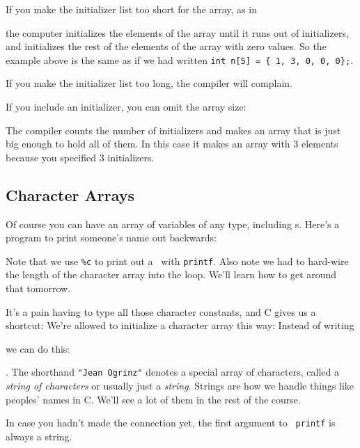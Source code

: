 If you make the initializer list too short for the array, as in

\begin{flushleft}
\verb% int n[5] = { 1, 3 }; %
\end{flushleft}

\noindent the computer initializes the elements of the array until it
runs out of initializers, and initializes the rest of the elements of
the array with zero values.  So the example above is the same as if we
had written {\tt int n[5] = \{ 1, 3, 0, 0, 0\};}.

If you make the initializer list too long, the compiler will complain.

If you include an initializer, you can omit the array size:

\begin{flushleft}
\verb% int n[] = { 1, 3, 5}; %
\end{flushleft}

The compiler counts the number of initializers and makes an array that
is just big enough to hold all of them.  In this case it makes an array
with 3 elements because you specified 3 initializers.

\subsection{Character Arrays}

Of course you can have an array of variables of any type, including \chr
s.  Here's a program to print someone's name out backwards:



Note that we use {\tt\%c} to print out a \chr\  with {\tt printf}.  Also
note we had to hard-wire the length of the character array into the
loop.  We'll learn how to get around that tomorrow.

It's a pain having to type all those character constants, and C gives us
a shortcut:  We're allowed to initialize a character array this way:
Instead of writing

\begin{flushleft}
\verb%char name[] = { 'J', 'e', 'a', 'n', ' ', 'O', 'g', 'r', 'i', 'n', 'z' };%
\end{flushleft}

\noindent we can do this:

\begin{flushleft}
\verb%char name[] = "Jean Ogrinz";%
\end{flushleft}

\noindent .  The shorthand {\tt "Jean Ogrinz"} denotes a special array of
characters, called a {\em string of characters}\/ or usually just a {\em
string}\/.  Strings are how we handle things like peoples' names in C.
We'll see a lot of them in the rest of the course.  

In case you hadn't made the connection yet, the first argument to {\tt
printf} is always a string.

